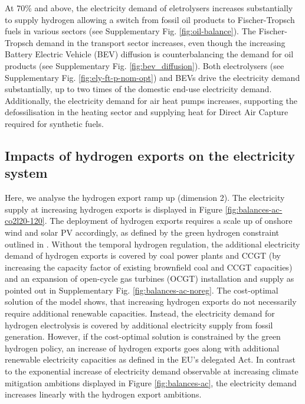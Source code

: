 \documentclass[5p,numafflabel]{elsarticle}
\begin{document}
At 70\% and above, the electricity demand of eletrolysers increases substantially to supply hydrogen allowing a switch from fossil oil products to Fischer-Tropsch fuels in various sectors (see Supplementary Fig. \ref{fig:oil-balance}). 
The Fischer-Tropsch demand in the transport sector increases, even though the increasing Battery Electric Vehicle (BEV) diffusion is counterbalancing the demand for oil products (see Supplementary Fig. \ref{fig:bev_diffusion}). 
Both electrolysers (see Supplementary Fig. \ref{fig:ely-ft-p-nom-opt}) and BEVs drive the electricity demand substantially, up to two times of the domestic end-use electricity demand. 
Additionally, the electricity demand for air heat pumps increases, supporting the defossilisation in the heating sector and supplying heat for Direct Air Capture required for synthetic fuels.


\subsection*{Impacts of hydrogen exports on the electricity system}
\label{subsec:increase_h2}

Here, we analyse the hydrogen export ramp up (dimension 2). The electricity supply at increasing hydrogen exports is displayed in Figure \ref{fig:balances-ac-co2l20-120}. The deployment of hydrogen exports requires a scale up of onshore wind and solar PV accordingly, as defined by the green hydrogen constraint outlined in .
Without the temporal hydrogen regulation, the additional electricity demand of hydrogen exports is covered by coal power plants and CCGT (by increasing the capacity factor of existing brownfield coal and CCGT capacities) and an expansion of open-cycle gas turbines (OCGT) installation and supply as pointed out in Supplementary Fig. \ref{fig:balances-ac-noreg}.
The cost-optimal solution of the model shows, that increasing hydrogen exports do not necessarily require additional renewable capacities. Instead, the electricity demand for hydrogen electrolysis is covered by additional electricity supply from fossil generation. However, if the cost-optimal solution is constrained by the green hydrogen policy, an increase of hydrogen exports goes along with additional renewable electricity capacities as defined in the EU's delegated Act.
In contrast to the exponential increase of electricity demand observable at increasing climate mitigation ambitions displayed in Figure \ref{fig:balances-ac}, the electricity demand increases linearly with the hydrogen export ambitions.
\end{document}
